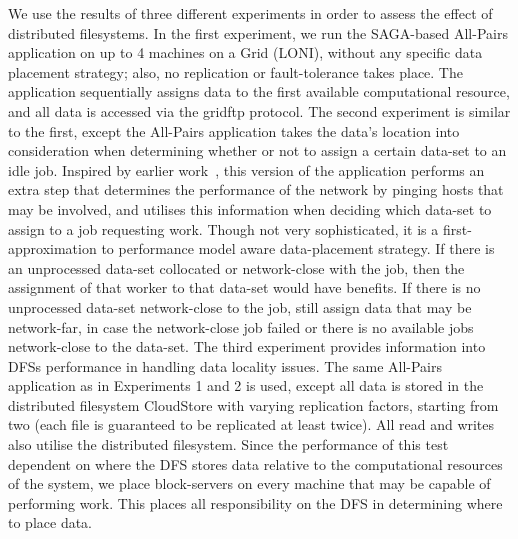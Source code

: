 \documentclass[a4paper,11pt]{article}
\begin{document}
We use the results of three different experiments in order to assess the effect of distributed filesystems. In the first experiment, we run the SAGA-based All-Pairs application on up to 4 machines on a Grid (LONI), without any specific data placement strategy; also, no replication or fault-tolerance takes place. The application sequentially assigns data to the first available computational resource, and all data is accessed via the gridftp protocol. The second experiment is similar to the first, except the All-Pairs application takes the data's location into consideration when determining whether or not to assign a certain data-set to an idle job. Inspired by earlier work~\cite{netperf}, this version of the application performs an extra step that determines the performance of the network by pinging hosts that may be involved, and utilises this information when deciding which data-set to assign to a job requesting work. Though not very sophisticated, it is a first-approximation to performance model aware data-placement strategy.  If there is an unprocessed data-set collocated or network-close with the job, then the assignment of that worker to that data-set would have benefits. If there is no unprocessed data-set network-close to the job, still assign data that may be network-far, in case the network-close job failed or there is no available jobs network-close to the data-set. The third experiment provides information into DFSs performance in handling data locality issues. The same All-Pairs application as in Experiments 1 and 2 is used, except all data is stored in the distributed filesystem CloudStore with varying replication factors, starting from two (each file is guaranteed to be replicated at least twice). All read and writes also utilise the distributed filesystem. Since the performance of this test dependent on where the DFS stores data relative to the computational resources of the system, we place block-servers on every machine that may be capable of performing work. This places all responsibility on the DFS in determining where to place data.
\end{document}

